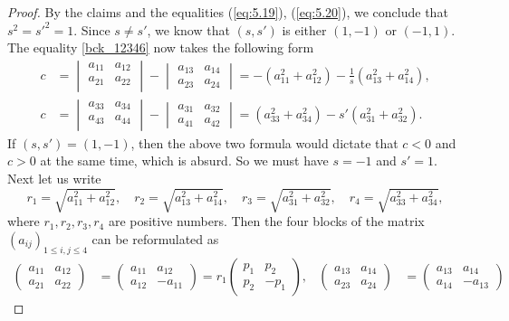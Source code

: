 \documentclass[10pt,a4paper]{amsart}
\begin{document}
\begin{proof}
By the claims and the equalities (\ref{eq:5.19}), (\ref{eq:5.20}), we conclude that $s^2=s'^2=1$. Since $s\neq s'$, we know that $(s,s')$ is either $(1,-1)$ or $(-1,1)$. The equality \eqref{bck_12346} now takes the following form
\[\begin{split}
c &=\begin{vmatrix} a_{11} & a_{12} \\ a_{21} & a_{22} \\ \end{vmatrix} - \begin{vmatrix} a_{13} & a_{14} \\ a_{23} & a_{24} \end{vmatrix}
=-(a^2_{11}+a_{12}^2)-\frac{1}{s}(a^2_{13}+a^2_{14}), \\
c &= \begin{vmatrix} a_{33} & a_{34} \\ a_{43} & a_{44} \\ \end{vmatrix} - \begin{vmatrix} a_{31} & a_{32} \\ a_{41} & a_{42} \end{vmatrix}
=(a_{33}^2 + a_{34}^2) -s'(a_{31}^2+a_{32}^2).
\end{split}\]
If $(s,s')=(1,-1)$, then the above two formula would dictate that $c<0$ and $c>0$ at the same time, which is absurd. So we must have $s=-1$ and $s'=1$.
Next let us write
\[r_1 = \sqrt{a_{11}^2 + a_{12}^2},\quad r_2 = \sqrt{a_{13}^2+a_{14}^2},\quad r_3=\sqrt{a_{31}^2+a_{32}^2},\quad r_4=\sqrt{a_{33}^2+a_{34}^2},\]
where $r_1,r_2,r_3,r_4$ are positive numbers. Then the four blocks of the matrix $(a_{ij})_{1\leq i,j\leq 4}$ can be reformulated as
\begin{align*}
\begin{pmatrix} a_{11} & a_{12} \\ a_{21} & a_{22}\end{pmatrix} &= \begin{pmatrix} a_{11} & a_{12} \\ a_{12} & -a_{11} \end{pmatrix}
=r_1 \begin{pmatrix} p_1 & p_2 \\ p_2 & -p_1 \end{pmatrix}, &
\begin{pmatrix} a_{13} & a_{14} \\ a_{23} & a_{24} \end{pmatrix} &= \begin{pmatrix} a_{13} & a_{14} \\ a_{14} & -a_{13} \end{pmatrix}

\end{align*}
\end{proof}
\end{document}
